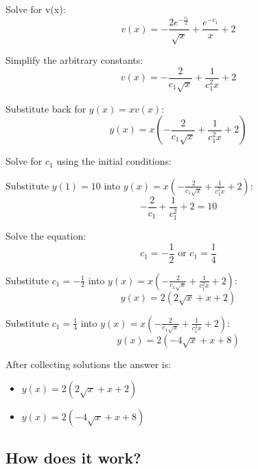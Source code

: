 \documentclass[12pt,letterpaper]{article}
\begin{document}
Solve for v(x):
\begin{equation}
     v(x) = - \frac{2e^{-\frac{c_1}{2}}}{\sqrt{x}} + \frac{e^{-c_1}}{x} + 2
\end{equation}

Simplify the arbitrary constants:
\begin{equation}
     v(x) = - \frac{2}{c_1\sqrt{x}} + \frac{1}{c_1^2x} + 2
\end{equation}

Substitute back for $y(x) = x v(x)$:
\begin{equation}
     y(x) = x(- \frac{2}{c_1\sqrt{x}} + \frac{1}{c_1^2x} + 2)
\end{equation}

Solve for $c_1$ using the initial conditions:

Substitute $y(1) = 10$ into $y(x) = x(- \frac{2}{c_1\sqrt{x}} + \frac{1}{c_1^2x} + 2)$:
\begin{equation}
     -\frac{2}{c_1} + \frac{1}{c_1^2} + 2 = 10
\end{equation}

Solve the equation:
\begin{equation}
     c_1 = -\frac{1}{2} \text{ or } c_1 = \frac{1}{4}
\end{equation}

Substitute $c_1 = -\frac{1}{2}$ into $y(x) = x(- \frac{2}{c_1\sqrt{x}} + \frac{1}{c_1^2x} + 2)$:
\begin{equation}
     y(x) = 2 (2 \sqrt{x} + x + 2)
\end{equation}

Substitute $c_1 = \frac{1}{4}$ into $y(x) = x(- \frac{2}{c_1\sqrt{x}} + \frac{1}{c_1^2x} + 2)$:
\begin{equation}
     y(x) = 2 (-4 \sqrt{x} + x + 8)
\end{equation}

After collecting solutions the answer is: 
\begin{itemize}
    \item
         $y(x) = 2 (2 \sqrt{x} + x + 2)$
    \item
         $y(x) = 2 (-4 \sqrt{x} + x + 8)$
\end{itemize}


\begin{center}
    \section*{How does it work?}
\end{center}
\end{document}
